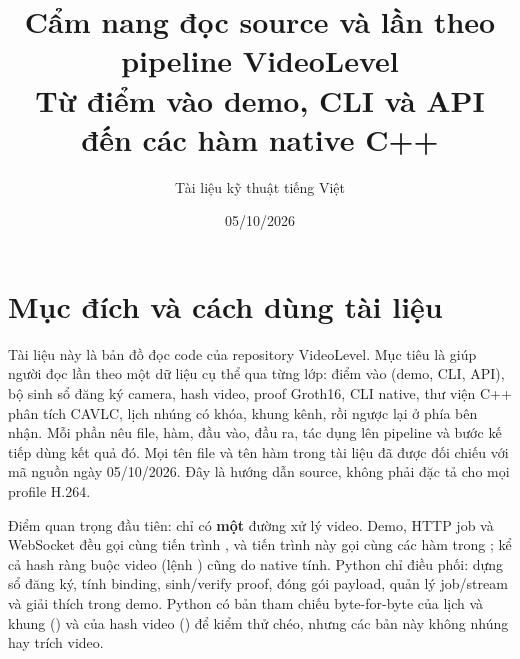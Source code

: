 \documentclass[11pt,a4paper]{article}
\title{Cẩm nang đọc source và lần theo pipeline VideoLevel\\
\large Từ điểm vào demo, CLI và API đến các hàm native C++}
\author{Tài liệu kỹ thuật tiếng Việt}
\date{05/10/2026}
\begin{document}
\maketitle

\noindent{}

\tableofcontents
\clearpage

\section{Mục đích và cách dùng tài liệu}

Tài liệu này là bản đồ đọc code của repository VideoLevel. Mục tiêu là giúp người
đọc lần theo một dữ liệu cụ thể qua từng lớp: điểm vào (demo, CLI, API), bộ sinh
sổ đăng ký camera, hash video, proof Groth16, CLI native, thư viện C++ phân tích
CAVLC, lịch nhúng có khóa, khung kênh, rồi ngược lại ở phía bên nhận. Mỗi phần nêu
file, hàm, đầu vào, đầu ra, tác dụng lên pipeline và bước kế tiếp dùng kết quả đó.
Mọi tên file và tên hàm trong tài liệu đã được đối chiếu với mã nguồn ngày
05/10/2026. Đây là hướng dẫn source, không phải đặc tả cho mọi profile H.264.

Điểm quan trọng đầu tiên: chỉ có \textbf{một} đường xử lý video. Demo, HTTP job và
WebSocket đều gọi cùng tiến trình , và tiến trình này gọi
cùng các hàm trong ; kể cả hash ràng buộc video
(lệnh ) cũng do native tính. Python chỉ điều phối: dựng sổ đăng ký,
tính binding, sinh/verify proof, đóng gói payload, quản lý job/stream và giải thích
trong demo. Python có bản tham chiếu byte-for-byte của lịch và khung
() và của hash video ()
để kiểm thử chéo, nhưng các bản này không nhúng hay trích video.
\end{document}
